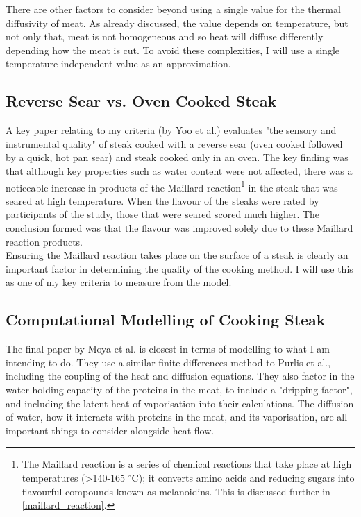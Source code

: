 \documentclass[11pt]{article}
\begin{document}
	There are other factors to consider beyond using a single value for the thermal diffusivity of meat. As already discussed, the value depends on temperature, but not only that, meat is not homogeneous and so heat will diffuse differently depending how the meat is cut. To avoid these complexities, I will use a single temperature-independent value as an approximation.
	
	\subsection*{Reverse Sear vs. Oven Cooked Steak}
	
	A key paper relating to my criteria (by Yoo et al.\cite{steak_sear}) evaluates "the sensory and instrumental quality" of steak cooked with a reverse sear (oven cooked followed by a quick, hot pan sear) and steak cooked only in an oven. The key finding was that although key properties such as water content were not affected, there was a noticeable increase in products of the Maillard reaction\footnote{The Maillard reaction is a series of chemical reactions that take place at high temperatures (>140-165 $^\circ\text{C}$); it converts amino acids and reducing sugars into flavourful compounds known as melanoidins. This is discussed further in \autoref{maillard_reaction}.} in the steak that was seared at high temperature. When the flavour of the steaks were rated by participants of the study, those that were seared scored much higher. The conclusion formed was that the flavour was improved solely due to these Maillard reaction products. \\
	
	Ensuring the Maillard reaction takes place on the surface of a steak is clearly an important factor in determining the quality of the cooking method. I will use this as one of my key criteria to measure from the model.
	
	\subsection*{Computational Modelling of Cooking Steak}
	
	The final paper by Moya et al.\cite{steak_modelling} is closest in terms of modelling to what I am intending to do. They use a similar finite differences method to Purlis et al., including the coupling of the heat and diffusion equations. They also factor in the water holding capacity of the proteins in the meat, to include a "dripping factor", and including the latent heat of vaporisation into their calculations. The diffusion of water, how it interacts with proteins in the meat, and its vaporisation, are all important things to consider alongside heat flow. \\
	
\end{document}
